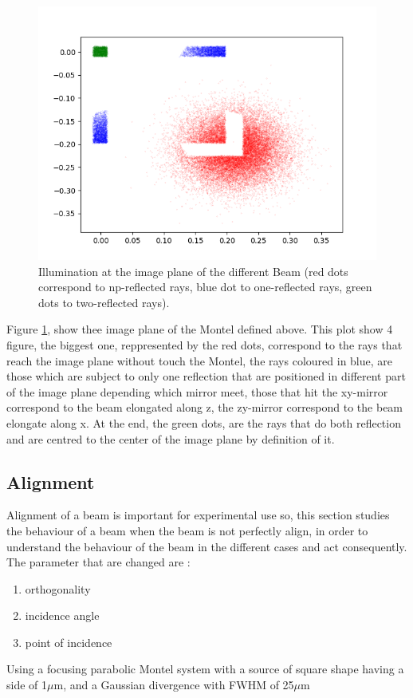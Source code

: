 \begin{figure}[]
%
\centering
%
\includegraphics[width=.6\textwidth]{Immagini/Chapter4/BigSourceMontel}
%
\caption{Illumination at the image plane of the different Beam (red dots correspond to np-reflected rays, blue dot to one-reflected rays, green dots to two-reflected rays).}
%
\label{fig:BigSourceMontel}
%
\end{figure}
%
Figure \ref{fig:BigSourceMontel}, show thee image plane of the Montel defined above. This plot show 4 figure, the biggest one, reppresented by the red dots, correspond to the rays that reach the image plane without touch the Montel, the rays coloured in blue, are those which are subject to only one reflection that are positioned in different part of the image plane depending which mirror meet, those that hit the xy-mirror correspond to the beam elongated along z, the zy-mirror correspond to the beam elongate along x. At the end, the green dots, are the rays that do both reflection and are centred to the center of the image plane by definition of it. 
\subsection{Alignment}
Alignment of a beam is important for experimental use so, this section studies the behaviour of a beam when the beam is not perfectly align, in order to understand the behaviour of the beam in the different cases and act consequently. 
\\
The parameter that are changed are :
\begin{enumerate}
	\item orthogonality
	\item incidence angle
	\item point of incidence
\end{enumerate}
Using a focusing parabolic Montel system with a source of square shape having a side of 1$\mu $m, and a Gaussian divergence with FWHM of 25$\mu $m

